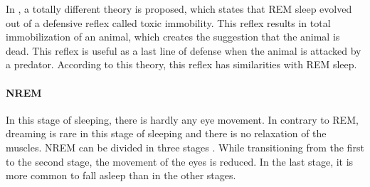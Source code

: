 In \cite{tsoukalas2012origin}, a totally different theory is proposed, which states that REM sleep evolved out of a defensive reflex called toxic immobility. 
This reflex results in total immobilization of an animal, which creates the suggestion that the animal is dead.
This reflex is useful as a last line of defense when the animal is attacked by a predator.
According to this theory, this reflex has similarities with REM sleep.

\paragraph{NREM}
In this stage of sleeping, there is hardly any eye movement.
In contrary to REM, dreaming is rare in this stage of sleeping and there is no relaxation of the muscles. NREM can be divided in three stages \cite{schulz2008rethinking}. While transitioning from the first to the second stage, the movement of the eyes is reduced. In the last stage, it is more common to fall asleep than in the other stages.

